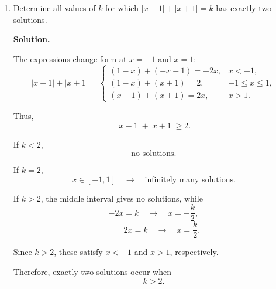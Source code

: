 \begin{enumerate}
		\textbf{Solution.}
		
		Let the three consecutive integers be
		$
		(n-1,\quad n,\quad n+1).
		$
		Then
		\[
		\quad\longrightarrow\quad
		3n=n(n-1)(n+1)
		\quad\longrightarrow\quad
		3n=n(n^2-1)
		\quad\longrightarrow\quad
		3n=n^3-n
		\quad\longrightarrow\quad
		n^3-4n=0
		\]
		\[
		\quad\longrightarrow\quad
		n(n^2-4)=0
		\quad\longrightarrow\quad
		n(n-2)(n+2)=0
		\quad\longrightarrow\quad
		\boxed{n=0,\,-2,\,2}.
		\]
		
		Therefore, the corresponding triples are
		
		\begin{minipage}[t]{0.48\textwidth}
			\[
			n=-2\longrightarrow(-3,-2,-1),
			\]
			\[
			n=0\longrightarrow(-1,0,1),
			\]
			\[
			n=2\longrightarrow(1,2,3).
			\]
		\end{minipage}
		\hfill
		\begin{minipage}[t]{0.48\textwidth}
			\[
			(n-1,\quad n,\quad n+1).
			\]
			\[
			\boxed{(-3,-2,-1),\ (-1,0,1),\ (1,2,3)}
			\]
		\end{minipage}
		
		\vspace{5mm}
		\item
		Determine all values of $k$ for which
		$
		|x-1|+|x+1|=k
		$
		has exactly two solutions.
		
		\begin{minipage}[t]{0.55\textwidth}
			
			
			\textbf{Solution.}
			
			The expressions change form at $x=-1$ and $x=1$:
			\[
			|x-1|+|x+1|=
			\begin{cases}
				(1-x)+(-x-1)=-2x, & x<-1,\\
				(1-x)+(x+1)=2, & -1\leq x\leq1,\\
				(x-1)+(x+1)=2x, & x>1.
			\end{cases}
			\]
			
		Thus,
			\[
			|x-1|+|x+1|\geq2.
			\]
			

		\end{minipage}
		\hfill
		\begin{minipage}[t]{0.36\textwidth}
					
						If $k<2$,
			\[
			\text{no solutions}.
			\]
			
			If $k=2$,
			\[
			x\in[-1,1]
			\quad\longrightarrow\quad
			\text{infinitely many solutions}.
			\]
			
			If $k>2$, the middle interval gives no solutions, while
			\[
			-2x=k
			\quad\longrightarrow\quad
			x=-\frac{k}{2},
			\]\[
			\qquad
			2x=k
			\quad\longrightarrow\quad
			x=\frac{k}{2}.
			\]
			
			Since $k>2$, these satisfy $x<-1$ and $x>1$, respectively.
			
			Therefore, exactly two solutions occur when
			\[
			\boxed{k>2}.
			\]
		\end{minipage}
		
	\end{enumerate}
	
